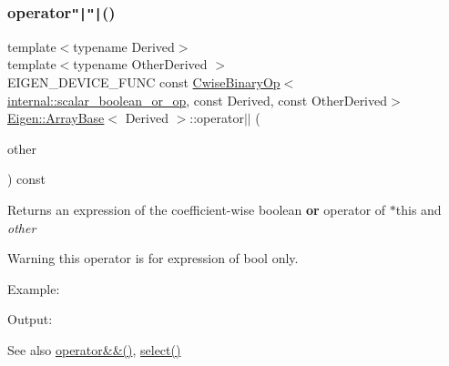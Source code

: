 \subsubsection{\texorpdfstring{operator\texttt{"|}\texttt{"|}()}{operator||()}}
{\footnotesize\ttfamily template$<$typename Derived$>$ \\
template$<$typename Other\+Derived $>$ \\
E\+I\+G\+E\+N\+\_\+\+D\+E\+V\+I\+C\+E\+\_\+\+F\+U\+NC const \mbox{\hyperlink{class_eigen_1_1_cwise_binary_op}{Cwise\+Binary\+Op}}$<$\mbox{\hyperlink{struct_eigen_1_1internal_1_1scalar__boolean__or__op}{internal\+::scalar\+\_\+boolean\+\_\+or\+\_\+op}}, const Derived, const Other\+Derived$>$ \mbox{\hyperlink{class_eigen_1_1_array_base}{Eigen\+::\+Array\+Base}}$<$ Derived $>$\+::operator$\vert$$\vert$ (\begin{DoxyParamCaption}\item[{const E\+I\+G\+E\+N\+\_\+\+C\+U\+R\+R\+E\+N\+T\+\_\+\+S\+T\+O\+R\+A\+G\+E\+\_\+\+B\+A\+S\+E\+\_\+\+C\+L\+A\+SS$<$ Other\+Derived $>$ \&}]{other }\end{DoxyParamCaption}) const\hspace{0.3cm}{\ttfamily [inline]}}

\begin{DoxyReturn}{Returns}
an expression of the coefficient-\/wise boolean {\bfseries{or}} operator of {\ttfamily $\ast$this} and {\itshape other} 
\end{DoxyReturn}
\begin{DoxyWarning}{Warning}
this operator is for expression of bool only.
\end{DoxyWarning}
Example\+: 
\begin{DoxyCodeInclude}{0}
\end{DoxyCodeInclude}
 Output\+: 
\begin{DoxyVerbInclude}
\end{DoxyVerbInclude}


\begin{DoxySeeAlso}{See also}
\mbox{\hyperlink{class_eigen_1_1_array_base_a1b3cb3e9a6f1c1e9168e963cb6e8db62}{operator\&\&()}}, \mbox{\hyperlink{class_eigen_1_1_dense_base_a65e78cfcbc9852e6923bebff4323ddca}{select()}} 
\end{DoxySeeAlso}
\mbox{\label{class_eigen_1_1_array_base_a3c09942b87b89c06dc204fe8cf514ade}} 
